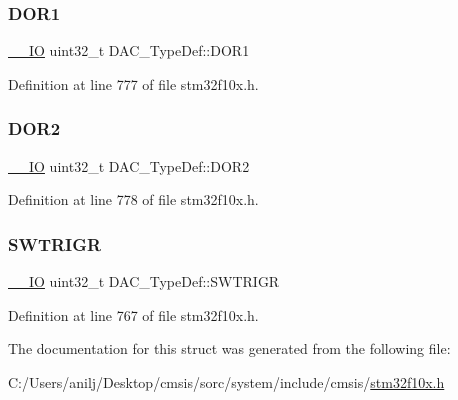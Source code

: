\subsubsection{\texorpdfstring{D\+O\+R1}{DOR1}}
{\footnotesize\ttfamily \hyperlink{core__sc300_8h_aec43007d9998a0a0e01faede4133d6be}{\+\_\+\+\_\+\+IO} uint32\+\_\+t D\+A\+C\+\_\+\+Type\+Def\+::\+D\+O\+R1}



Definition at line 777 of file stm32f10x.\+h.

\mbox{\label{struct_d_a_c___type_def_a1bde8391647d6422b39ab5ba4f13848b}} 
\subsubsection{\texorpdfstring{D\+O\+R2}{DOR2}}
{\footnotesize\ttfamily \hyperlink{core__sc300_8h_aec43007d9998a0a0e01faede4133d6be}{\+\_\+\+\_\+\+IO} uint32\+\_\+t D\+A\+C\+\_\+\+Type\+Def\+::\+D\+O\+R2}



Definition at line 778 of file stm32f10x.\+h.

\mbox{\label{struct_d_a_c___type_def_a4ccb66068a1ebee1179574dda20206b6}} 
\subsubsection{\texorpdfstring{S\+W\+T\+R\+I\+GR}{SWTRIGR}}
{\footnotesize\ttfamily \hyperlink{core__sc300_8h_aec43007d9998a0a0e01faede4133d6be}{\+\_\+\+\_\+\+IO} uint32\+\_\+t D\+A\+C\+\_\+\+Type\+Def\+::\+S\+W\+T\+R\+I\+GR}



Definition at line 767 of file stm32f10x.\+h.



The documentation for this struct was generated from the following file\+:\begin{DoxyCompactItemize}
\item 
C\+:/\+Users/anilj/\+Desktop/cmsis/sorc/system/include/cmsis/\hyperlink{stm32f10x_8h}{stm32f10x.\+h}\end{DoxyCompactItemize}
